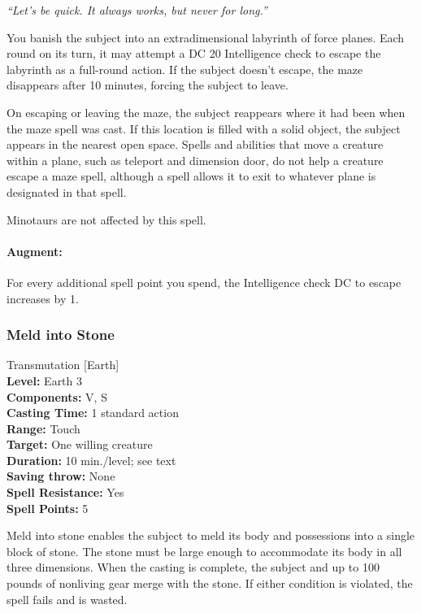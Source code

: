 \emph{``Let's be quick. It always works, but never for long.''}

You banish the subject into an extradimensional labyrinth of force planes. 
Each round on its turn, it may attempt a DC 20 Intelligence check to escape the labyrinth as a full-round action. 
If the subject doesn't escape, the maze disappears after 10 minutes, forcing the subject to leave.

On escaping or leaving the maze, the subject reappears where it had been when the maze spell was cast. 
If this location is filled with a solid object, the subject appears in the nearest open space. 
Spells and abilities that move a creature within a plane, such as teleport and dimension door, 
do not help a creature escape a maze spell, although a  spell allows it to exit to whatever plane is designated in that spell. 

Minotaurs are not affected by this spell.

\paragraph{Augment:} For every additional spell point you spend, the Intelligence check DC to escape increases by 1.
\subsubsection{Meld into Stone}
\label{Spell:MeldIntoStone}
Transmutation [Earth]
\\ \textbf{Level:} Earth 3
\\ \textbf{Components:} V, S
\\ \textbf{Casting Time:} 1 standard action
\\ \textbf{Range:} Touch
\\ \textbf{Target:} One willing creature
\\ \textbf{Duration:} 10 min./level; see text
\\ \textbf{Saving throw:} None
\\ \textbf{Spell Resistance:} Yes
\\ \textbf{Spell Points:} 5

Meld into stone enables the subject to meld its body and possessions into a single block of stone. 
The stone must be large enough to accommodate its body in all three dimensions. 
When the casting is complete, the subject and up to 100 pounds of nonliving gear merge with the stone. 
If either condition is violated, the spell fails and is wasted.

